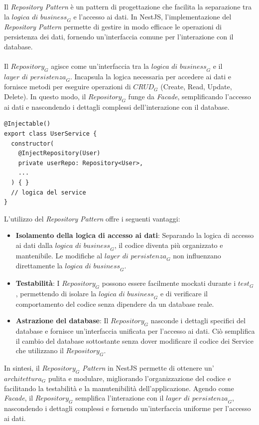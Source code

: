 Il \textit{Repository Pattern} è un pattern di progettazione che facilita la separazione tra la $\textit{logica di business}_G$ e l'accesso ai dati. In NestJS, l'implementazione del \textit{Repository Pattern} permette di gestire in modo efficace le operazioni di persistenza dei dati, fornendo un'interfaccia comune per l'interazione con il database.\\
\\Il $\textit{Repository}_G$ agisce come un'interfaccia tra la $\textit{logica di business}_G$ e il $\textit{layer di persistenza}_G$. Incapsula la logica necessaria per accedere ai dati e fornisce metodi per eseguire operazioni di $\textit{CRUD}_G$ (Create, Read, Update, Delete). In questo modo, il $\textit{Repository}_G$ funge da \textit{Facade}, semplificando l'accesso ai dati e nascondendo i dettagli complessi dell'interazione con il database.

\begin{lstlisting}[style=ES6, caption={Esempio di utilizzo del $\textit{Repository}_G$ Pattern in un Service di NestJS}]
@Injectable()
export class UserService {
  constructor(
    @InjectRepository(User)
    private userRepo: Repository<User>,
    ...
  ) { }
  // logica del service
}
\end{lstlisting}
L'utilizzo del \textit{Repository Pattern} offre i seguenti vantaggi:

\begin{itemize}
    \item \textbf{Isolamento della logica di accesso ai dati}: Separando la logica di accesso ai dati dalla $\textit{logica di business}_G$, il codice diventa più organizzato e mantenibile. Le modifiche al $\textit{layer di persistenza}_G$ non influenzano direttamente la $\textit{logica di business}_G$.

    \item \textbf{Testabilità}: I $\textit{Repository}_G$ possono essere facilmente mockati durante i $\textit{test}_G$, permettendo di isolare la $\textit{logica di business}_G$ e di verificare il comportamento del codice senza dipendere da un database reale.
    
    \item \textbf{Astrazione del database}: Il $\textit{Repository}_G$ nasconde i dettagli specifici del database e fornisce un'interfaccia unificata per l'accesso ai dati. Ciò semplifica il cambio del database sottostante senza dover modificare il codice dei Service che utilizzano il $\textit{Repository}_G$.
    
\end{itemize}
In sintesi, il \textit{$\textit{Repository}_G$ Pattern} in NestJS permette di ottenere un'$\textit{architettura}_G$ pulita e modulare, migliorando l'organizzazione del codice e facilitando la testabilità e la manutenibilità dell'applicazione. Agendo come \textit{Facade}, il $\textit{Repository}_G$ semplifica l'interazione con il $\textit{layer di persistenza}_G$, nascondendo i dettagli complessi e fornendo un'interfaccia uniforme per l'accesso ai dati.

